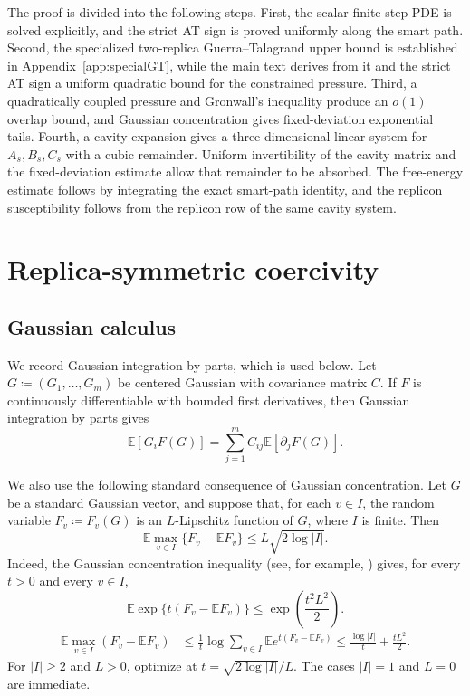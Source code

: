 \documentclass[11pt]{article}
\numberwithin{equation}{section}
\newcommand{\E}{\mathbb{E}}
\newcommand{\1}{\mathbf 1}
\begin{document}
The proof is divided into the following steps.  First, the scalar
finite-step PDE is solved explicitly, and the strict AT sign is proved
uniformly along the smart path.  Second, the specialized two-replica
Guerra--Talagrand upper bound is established in
Appendix~\ref{app:specialGT}, while the main text derives from it and
the strict AT sign a uniform quadratic bound for the constrained
pressure.  Third, a quadratically
coupled pressure and Gronwall's inequality produce an $o(1)$ overlap
bound, and Gaussian concentration gives fixed-deviation exponential
tails.  Fourth, a cavity expansion gives a three-dimensional linear
system for $A_s,B_s,C_s$ with a cubic remainder.  Uniform invertibility
of the cavity matrix and the fixed-deviation estimate allow that
remainder to be absorbed.  The free-energy estimate follows by
integrating the exact smart-path identity, and the replicon
susceptibility follows from the replicon row of the same cavity system.

\section{Replica-symmetric coercivity}\label{sec:coercivity}

\subsection{Gaussian calculus}\label{subsec:gaussian}

We record Gaussian integration by parts, which is used below.  Let
$G\coloneqq(G_1,\ldots,G_m)$ be centered Gaussian with covariance
matrix $C$.
If $F$ is continuously differentiable with bounded first derivatives,
then Gaussian integration by parts gives
\begin{equation}
 \E[G_iF(G)]=\sum_{j=1}^m C_{ij}\E[\partial_jF(G)].
 \label{eq:GIBP}
\end{equation}

We also use the following standard consequence of Gaussian concentration.
Let \(G\) be a standard Gaussian vector, and suppose that, for each
\(v\in I\), the random variable \(F_v\coloneqq F_v(G)\) is an
\(L\)-Lipschitz
function of \(G\), where \(I\) is finite. Then
\begin{equation}
 \E\max_{v\in I}\{F_v-\E F_v\}
 \le L\sqrt{2\log|I|}.
 \label{eq:gaussianmaxgeneral}
\end{equation}
Indeed, the Gaussian concentration inequality (see, for example,
\cite{Ledoux}) gives, for every \(t>0\)
and every \(v\in I\),
\[
 \E\exp\bigl\{t(F_v-\E F_v)\bigr\}
 \le \exp\left(\frac{t^2L^2}{2}\right).
\]
\[
\begin{aligned}
 \E\max_{v\in I}(F_v-\E F_v)
 &\le\frac1t\log\sum_{v\in I}
 \E e^{t(F_v-\E F_v)}
 \le\frac{\log|I|}{t}+\frac{tL^2}{2}.
\end{aligned}
\]
For $|I|\ge2$ and $L>0$, optimize at
$t=\sqrt{2\log|I|}/L$.  The cases $|I|=1$ and $L=0$ are immediate.
\end{document}
